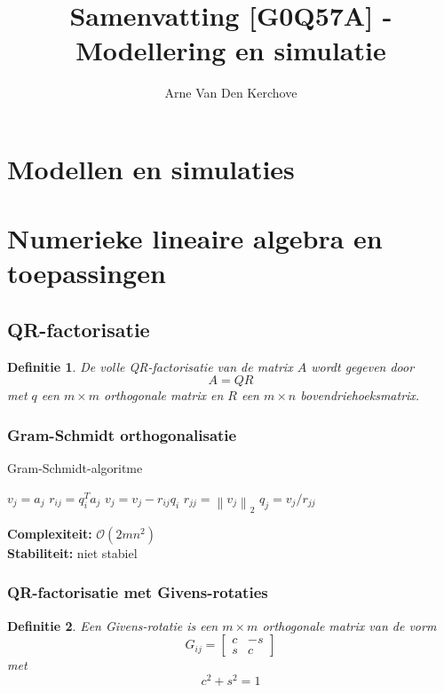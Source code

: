 \documentclass{article}
\title{Samenvatting [G0Q57A] - Modellering en simulatie}
\author{Arne Van Den Kerchove}
\newtheorem{mydef}{Definitie}
\newcommand{\norm}[1]{\left\lVert#1\right\rVert}
\begin{document}
	\maketitle
	
	\tableofcontents
	
	\pagebreak
	
	\section{Modellen en simulaties}
	\section{Numerieke lineaire algebra en toepassingen}
	\subsection{QR-factorisatie}
	
	
	\begin{mydef}
		De volle QR-factorisatie van de matrix $A$ wordt gegeven door
		$$	A=QR  $$
		met $q$ een $m \times m$ orthogonale matrix en $R$ een $m \times n $ bovendriehoeksmatrix.
	\end{mydef}

	\subsubsection{Gram-Schmidt orthogonalisatie}
	

	\begin{algorithm}[!ht]
		\caption{Gram-Schmidt-algoritme}
		\begin{algorithmic}[1]
					\State $v_j = a_j$
						\State $r_{ij} = q_i^T a_j$
						\State $v_j = v_j - r_{ij} q_i$
					\EndFor
					\State $r_{jj} = \norm{v_j}_2$
					\State $q_j = v_j/r_{jj}$
				\EndFor 
			\EndProcedure
		\end{algorithmic}
	\end{algorithm}

	\textbf{Complexiteit:} $\mathcal{O}(2mn^2)$\\
	\textbf{Stabiliteit:} niet stabiel
	
	\subsubsection{QR-factorisatie met Givens-rotaties}
	
	\begin{mydef}
		Een Givens-rotatie is een $m \times m$ orthogonale matrix van de vorm
		$$
		G_{ij} = 
		\begin{bmatrix}
			c & -s \\
			s &  c  
		\end{bmatrix}
		$$
		met
		$$ c^2 + s^2 = 1 $$
	\end{mydef}
\end{document}
